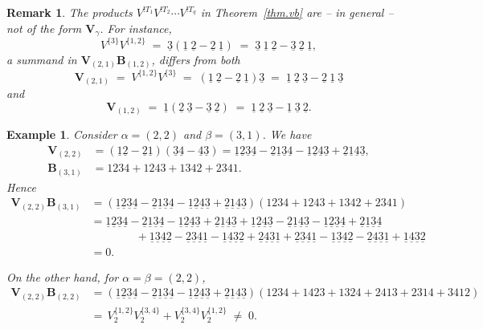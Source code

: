 \documentclass[submission]{FPSAC2026}
\newtheorem{example}{Example}
\newtheorem{remark}{Remark}
\newcommand{\ul}{\underline}
\begin{document}


\begin{remark}
The products $V^{!T_1} V^{!T_2} \cdots V^{!T_{q}}$ in Theorem~\ref{thm.vb}
are -- in general -- not of the form $\mathbf{V}_{\gamma}$. For instance,
\[
V^{\{3\}}V^{\{1,2\}}\;
=\;\underline3(\underline1\ \underline2-\underline2\ \underline1)\;
=\;\underline3\ \underline1\ \underline2-\underline3\ \underline2\ \underline1,
\]
a summand in $\mathbf{V}_{(2,1)}\mathbf{B}_{(1,2)}$,
differs from both
\[
\mathbf{V}_{(2,1)}\;=\;V^{\{1,2\}}V^{\{3\}}\;
=\;(\underline1\ \underline2-\underline2\ \underline1)\underline3\;
=\;\underline1\ \underline2\ \underline3
-\underline2\ \underline1\ \underline3
\]
and
\[
\mathbf{V}_{(1,2)}\;
=\;\underline1(\underline2\ \underline3-\underline3\ \underline2)\;
=\;\underline1\ \underline2\ \underline3-\underline1\ \underline3\ \underline2.
\]
\end{remark}

\begin{example}

Consider $\alpha=(2,2)$ and $\beta=(3,1)$. We have
\begin{align*}
\mathbf{V}_{(2,2)} &  =(\ul1\ul2-\ul2\ul1)(\ul3\ul4-\ul4\ul3)=\ul1\ul2\ul3\ul4-\ul2\ul1\ul3\ul4-\ul1\ul2\ul4\ul3+\ul2\ul1\ul4\ul3,\\
\mathbf{B}_{(3,1)} &  =1234+1243+1342+2341.
\end{align*}
Hence
\begin{align*}
\mathbf{V}_{(2,2)}\mathbf{B}_{(3,1)} &
=(\ul1\ul2\ul3\ul4-\ul2\ul1\ul3\ul4-\ul1\ul2\ul4\ul3+\ul2\ul1\ul4\ul3)(1234+1243+1342+2341)\\
&=\ul1\ul2\ul3\ul4-\ul2\ul1\ul3\ul4-\ul1\ul2\ul4\ul3+\ul2\ul1\ul4\ul3
+\ul1\ul2\ul4\ul3-\ul2\ul1\ul4\ul3-\ul1\ul2\ul3\ul4+\ul2\ul1\ul3\ul4\\
&\qquad \qquad +\ul1\ul3\ul4\ul2-\ul2\ul3\ul4\ul1-\ul1\ul4\ul3\ul2+\ul2\ul4\ul3\ul1
+\ul2\ul3\ul4\ul1-\ul1\ul3\ul4\ul2-\ul2\ul4\ul3\ul1+\ul1\ul4\ul3\ul2\\
&  =0.
\end{align*}


On the other hand, for $\alpha=\beta=(2,2)$,
\begin{align*}
\mathbf{V}_{(2,2)}\mathbf{B}_{(2,2)}  & = (\ul1\ul2\ul3\ul4 - \ul2\ul1\ul3\ul4 - \ul1\ul2\ul4\ul3 + \ul2\ul1\ul4\ul3) (1234 +
1423 + 1324 + 2413 + 2314 + 3412)\\[2mm]
& =\, V_{2}^{\{1,2\}} V_{2}^{\{3,4\}} + V_{2}^{\{3,4\}} V_{2}^{\{1,2\}} \;\neq\; 0.
\end{align*}

\end{example}
\end{document}
